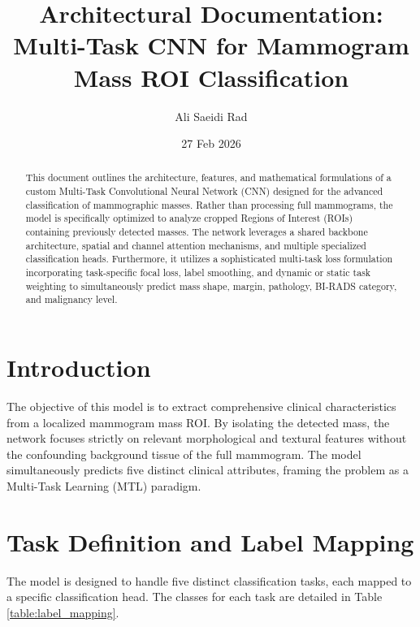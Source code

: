 \documentclass[11pt,a4paper]{article}
\title{\textbf{Architectural Documentation: \\ Multi-Task CNN for Mammogram Mass ROI Classification}}
\author{Ali Saeidi Rad}
\date{27 Feb 2026}
\begin{document}
\maketitle

\begin{abstract}
This document outlines the architecture, features, and mathematical formulations of a custom Multi-Task Convolutional Neural Network (CNN) designed for the advanced classification of mammographic masses. Rather than processing full mammograms, the model is specifically optimized to analyze cropped Regions of Interest (ROIs) containing previously detected masses. The network leverages a shared backbone architecture, spatial and channel attention mechanisms, and multiple specialized classification heads. Furthermore, it utilizes a sophisticated multi-task loss formulation incorporating task-specific focal loss, label smoothing, and dynamic or static task weighting to simultaneously predict mass shape, margin, pathology, BI-RADS category, and malignancy level.
\end{abstract}

\section{Introduction}
The objective of this model is to extract comprehensive clinical characteristics from a localized mammogram mass ROI. By isolating the detected mass, the network focuses strictly on relevant morphological and textural features without the confounding background tissue of the full mammogram. The model simultaneously predicts five distinct clinical attributes, framing the problem as a Multi-Task Learning (MTL) paradigm.

\section{Task Definition and Label Mapping}
The model is designed to handle five distinct classification tasks, each mapped to a specific classification head. The classes for each task are detailed in Table \ref{table:label_mapping}.
\end{document}
